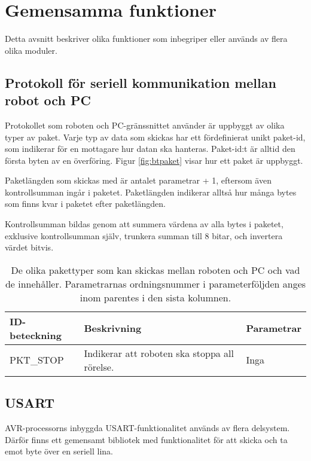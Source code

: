 \section{Gemensamma funktioner}
Detta avsnitt beskriver olika funktioner som inbegriper eller används av flera olika moduler.

\subsection{Protokoll för seriell kommunikation mellan robot och PC}
\label{sec:bt-protokoll}
Protokollet som roboten och PC-gränssnittet använder är uppbyggt av olika typer av paket. Varje typ av data som skickas har ett fördefinierat unikt paket-id, som indikerar för en mottagare hur datan ska hanteras. Paket-id:t är alltid den första byten av en överföring. Figur \ref{fig:btpaket} visar hur ett paket är uppbyggt.


Paketlängden som skickas med är antalet parametrar + 1, eftersom även kontrollsumman ingår i paketet. Paketlängden indikerar alltså hur många bytes som finns kvar i paketet efter paketlängden.

Kontrollsumman bildas genom att summera värdena av alla bytes i paketet, exklusive kontrollsumman själv, trunkera summan till 8 bitar, och invertera värdet bitvis.

\begin{table}[H]
\begin{tabularx}{\textwidth}{|l|X|p{5cm}|}
\hline
\textbf{ID-beteckning} & \textbf{Beskrivning} & \textbf{Parametrar} \\ \hline
PKT\_STOP & Indikerar att roboten ska stoppa all rörelse. & Inga \\ \hline
\end{tabularx}
\caption{De olika pakettyper som kan skickas mellan roboten och PC och vad de innehåller. Parametrarnas ordningsnummer i parameterföljden anges inom parentes i den sista kolumnen.}
\end{table}

\subsection{USART}
\label{sec:usart}
AVR-processorns inbyggda USART-funktionalitet används av flera delsystem. Därför finns ett gemensamt bibliotek med funktionalitet för att skicka och ta emot byte över en seriell lina.

